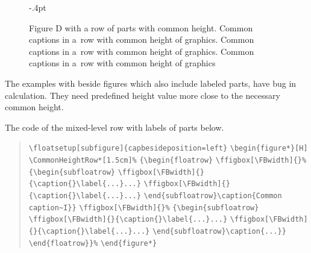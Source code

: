 \documentclass{book}
\makeatletter
\newenvironment{Quote}[1][\parindent]{\par\hfuzz30pt\setlength{\leftmargini}{#1}\RestoreSpaces
    \small\begin{quote}\obeylines\parskip0pt}{\end{quote}\par\@endpetrue}
\makeatother
\begin{document}
\begin{figure}[H]\fboxsep-.4pt
\ffigbox{}%
{\caption{Figure D with a row of parts with common height.
Common captions in a~row with common height of graphics.
Common captions in a~row with common height of graphics.
Common captions in a~row with common height of graphics}}
\end{figure}%

\clearpage

The examples with beside figures which also include labeled parts, have bug in
calculation. They need predefined height value more close to the necessary common
height.

The code of the mixed-level row with labels of parts below.
\begin{Quote}%
\verb|\floatsetup[subfigure]{capbesideposition=left}|
\verb|\begin{figure*}[H]|
\verb|\CommonHeightRow*[1.5cm]%|
\verb|{\begin{floatrow}|
\verb|\ffigbox[\FBwidth]{}%|
\verb|{\begin{subfloatrow}|
\verb|\ffigbox[\FBwidth]{}{\caption{}\label{...}...}|
\verb|\ffigbox[\FBwidth]{}{\caption{}\label{...}...}|
\verb|\end{subfloatrow}\caption{Common caption~I}}|
\verb|\ffigbox[\FBwidth]{}%|
\verb|{\begin{subfloatrow}|
\verb|\ffigbox[\FBwidth]{}{\caption{}\label{...}...}|
\verb|\ffigbox[\FBwidth]{}{\caption{}\label{...}...}|
\verb|\end{subfloatrow}\caption{...}}|
\verb|\end{floatrow}}%|
\verb|\end{figure*}|%
\end{Quote}%
\end{document}
